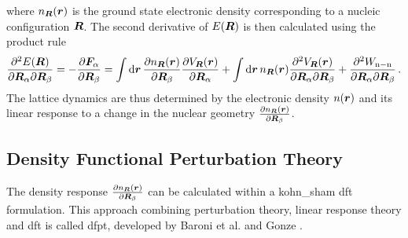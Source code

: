 \documentclass[main.tex]{subfiles}
\begin{document}
where \(n_{\vb*{R}} (\vb*{r})\) is the ground state electronic density corresponding to a nucleic configuration \(\vb*{R}\).
The second derivative of \(E(\vb*{R})\) is then calculated using the product rule
\begin{equation}\label{eq:dfpt_second_energy_derivative}
    \pdv{E(\vb*{R})}{\vb*{R}_{\alpha}}{\vb*{R}_{\beta}} = - \pdv{\vb*{F}_{\alpha}}{\vb*{R}_{\beta}} = \int \dd{\vb*{r}} \pdv{n_{\vb*{R}} (\vb*{r})}{\vb*{R}_{\beta}}  \pdv{V_{\vb*{R}} (\vb*{r})}{\vb*{R}_{\alpha}}
    + \int \dd{\vb*{r}} n_{\vb*{R}} (\vb*{r}) \pdv{V_{\vb*{R}} (\vb*{r})}{\vb*{R}_{\alpha}}{\vb*{R}_{\beta}}
    + \pdv{W_{\mathrm{n-n}}}{\vb*{R}_{\alpha}}{\vb*{R}_{\beta}} \,.
\end{equation}
The lattice dynamics are thus determined by the electronic density \(n(\vb*{r})\) and its linear response to a change in the nuclear geometry \(\pdv{n_{\vb*{R}} (\vb*{r})}{\vb*{R}_{\beta}}\).

\subsection{Density Functional Perturbation Theory}

The density response \(\pdv{n_{\vb*{R}} (\vb*{r})}{\vb*{R}_{\beta}}\) can be calculated within a \acrshort{kohn_sham} \acrshort{dft} formulation.
This approach combining perturbation theory, linear response theory and \acrshort{dft} is called \acrfull{dfpt}, developed by Baroni et al. \cite{baroni_greens-function_1987} and Gonze \cite{gonze_adiabatic_1995}.
\end{document}
